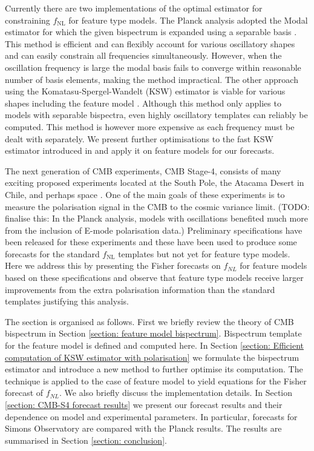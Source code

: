 Currently there are two implementations of the optimal estimator for constraining $f_\text{NL}$ for feature type models. The Planck analysis adopted the Modal estimator for which the given bispectrum is expanded using a separable basis \cite{Fergusson2012,Fergusson2014}. This method is efficient and can flexibly account for various oscillatory shapes and can easily constrain all frequencies simultaneously. However, when the oscillation frequency is large the modal basis fails to converge within reasonable number of basis elements, making the method impractical. The other approach using the Komatasu-Spergel-Wandelt (KSW) estimator is viable for various shapes including the feature model \cite{Komatsu2005,Munchmeyer2014}. Although this method only applies to models with separable bispectra, even highly oscillatory templates can reliably be computed.  This method is however more expensive as each frequency must be dealt with separately. We present further optimisations to the fast KSW estimator introduced in \cite{Yadav2007} and apply it on feature models for our forecasts.

The next generation of CMB experiments, CMB Stage-4, consists of many exciting proposed experiments located at the South Pole, the Atacama Desert in Chile, and perhaps space \cite{Abazajian2016,TheSimonsObservatoryCollaboration2018,TheCOrEcollaboration2015}. One of the main goals of these experiments is to measure the polarisation signal in the CMB to the cosmic variance limit. (TODO: finalise this: In the Planck analysis, models with oscillations benefited much more from the inclusion of E-mode polarisation data.) Preliminary specifications have been released for these experiments \cite{Abazajian2016,TheSimonsObservatoryCollaboration2018} and these have been used to produce some forecasts for the standard $f_\text{NL}$ templates but not yet for feature type models. Here we address this by presenting the Fisher forecasts on $f_{NL}$ for feature models based on these specifications and observe that feature type models receive larger improvements from the extra polarisation information than the standard templates justifying this analysis.

The section is organised as follows. First we briefly review the theory of CMB bispectrum in Section \ref{section: feature model bispectrum}. Bispectrum template for the feature model is defined and computed here. In Section \ref{section: Efficient computation of KSW estimator with polarisation} we formulate the bispectrum estimator and introduce a new method to further optimise its computation. The technique is applied to the case of feature model to yield equations for the Fisher forecast of $f_{NL}$. We also briefly discuss the implementation details. In Section \ref{section: CMB-S4 forecast results} we present our forecast results and their dependence on model and experimental parameters. In particular, forecasts for Simons Observatory are compared with the Planck results. The results are summarised in Section \ref{section: conclusion}.


